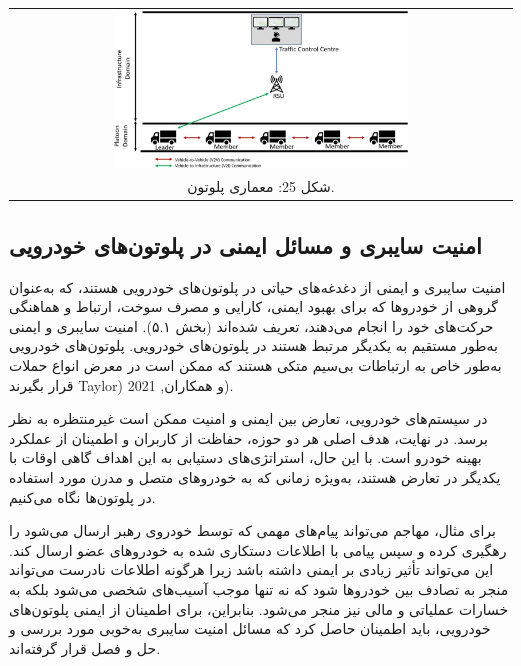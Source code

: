 \documentclass[a4paper,10pt]{article}
\begin{document}
            \begin{table}
            
                \centering
                \begin{tabular}{ c }
                    
                    \includegraphics[width=0.6\textwidth]{Image/fig25.jpg} \\

                    شکل 25: معماری پلوتون.

                \end{tabular}
    
            \end{table}

        \subsection{امنیت سایبری و مسائل ایمنی در پلوتون‌های خودرویی}

            امنیت سایبری و ایمنی از دغدغه‌های حیاتی در پلوتون‌های خودرویی هستند، که به‌عنوان گروهی از خودروها که برای بهبود ایمنی، کارایی و مصرف سوخت، ارتباط و هماهنگی حرکت‌های خود را انجام می‌دهند، تعریف شده‌اند (بخش ۵.۱). امنیت سایبری و ایمنی به‌طور مستقیم به یکدیگر مرتبط هستند در پلوتون‌های خودرویی. پلوتون‌های خودرویی به‌طور خاص به ارتباطات بی‌سیم متکی هستند که ممکن است در معرض انواع حملات قرار بگیرند Taylor) و همکاران, 2021).

            در سیستم‌های خودرویی، تعارض بین ایمنی و امنیت ممکن است غیرمنتظره به نظر برسد. در نهایت، هدف اصلی هر دو حوزه، حفاظت از کاربران و اطمینان از عملکرد بهینه خودرو است. با این حال، استراتژی‌های دستیابی به این اهداف گاهی اوقات با یکدیگر در تعارض هستند، به‌ویژه زمانی که به خودروهای متصل و مدرن مورد استفاده در پلوتون‌ها نگاه می‌کنیم.

            برای مثال، مهاجم می‌تواند پیام‌های مهمی که توسط خودروی رهبر ارسال می‌شود را رهگیری کرده و سپس پیامی با اطلاعات دستکاری شده به خودروهای عضو ارسال کند. این می‌تواند تأثیر زیادی بر ایمنی داشته باشد زیرا هرگونه اطلاعات نادرست می‌تواند منجر به تصادف بین خودروها شود که نه تنها موجب آسیب‌های شخصی می‌شود بلکه به خسارات عملیاتی و مالی نیز منجر می‌شود. بنابراین، برای اطمینان از ایمنی پلوتون‌های خودرویی، باید اطمینان حاصل کرد که مسائل امنیت سایبری به‌خوبی مورد بررسی و حل و فصل قرار گرفته‌اند.
\end{document}
